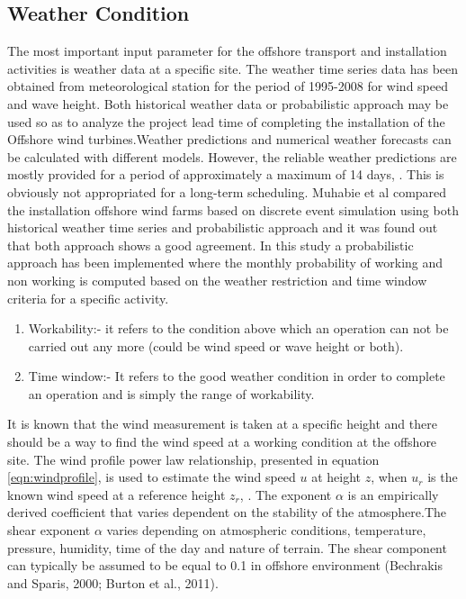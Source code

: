 \subsection{Weather Condition}

The most important input parameter for the offshore transport and installation activities is weather data at a specific site. The weather time series data has been obtained from meteorological station for the period of 1995-2008 for wind speed and wave height. Both historical weather data or probabilistic approach may be used so as to  analyze the project lead time of completing the installation of the Offshore wind turbines.Weather predictions and numerical weather forecasts can be calculated with different models. However, the reliable weather predictions are mostly provided for a period of approximately a maximum of 14 days, \cite{hinnenthal2007}. This is obviously not appropriated for a long-term scheduling. Muhabie et al \cite{Muhabie2015} compared the installation offshore wind farms based on discrete event simulation using both historical weather time series and probabilistic approach  and it was found out that both approach shows a good agreement. In this study a probabilistic approach has been implemented where the monthly probability of working and non working is computed based on the weather restriction and time window criteria for a specific activity. 
\begin{enumerate}
\item
Workability:- it refers to the condition above which an operation can not be carried out any more (could be wind speed or wave height or both).
\item Time window:- It refers to the good weather condition in order to complete an operation and is simply the range of workability.
\end{enumerate}
It is known that the wind measurement is taken at a specific height and there should be a way to find the wind speed at a working condition at the offshore site. 
The wind profile power law relationship, presented in equation \ref{eqn:windprofile}, is used to estimate the wind speed $u$ at height $z$, when $u_{r}$ is the known wind speed at a reference height $z_{r}$, \cite{1978Peterson}. The exponent $\alpha$ is an empirically derived coefficient that varies dependent on the stability of the atmosphere.The shear exponent $\alpha$ varies depending on atmospheric conditions, temperature, pressure, humidity, time of the day and nature of terrain\cite{Manwell2009}. The shear component can typically be assumed to be equal to 0.1 in offshore environment (Bechrakis and Sparis, 2000; Burton et al., 2011).

